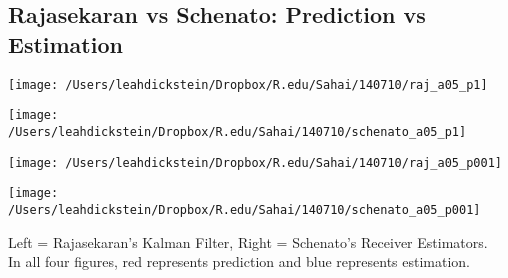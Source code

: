 \documentclass[leqno,twocolumn]{article}
\begin{document}
\subsection{Rajasekaran vs Schenato: Prediction vs Estimation}
\begin{minipage}[c]{0.5\textwidth}
\texttt{[image: /Users/leahdickstein/Dropbox/R.edu/Sahai/140710/raj\_a05\_p1]}
\end{minipage}
\begin{minipage}[c]{0.5\textwidth}
\texttt{[image: /Users/leahdickstein/Dropbox/R.edu/Sahai/140710/schenato\_a05\_p1]}
\end{minipage}

\begin{minipage}[c]{0.5\textwidth}
\texttt{[image: /Users/leahdickstein/Dropbox/R.edu/Sahai/140710/raj\_a05\_p001]}
\end{minipage}
\begin{minipage}[c]{0.5\textwidth}
\texttt{[image: /Users/leahdickstein/Dropbox/R.edu/Sahai/140710/schenato\_a05\_p001]}
\end{minipage}

Left = Rajasekaran's Kalman Filter, Right = Schenato's Receiver Estimators.\\
In all four figures, red represents prediction and blue represents estimation. 
\end{document}

